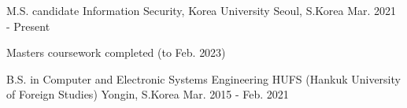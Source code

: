 

\begin{cventries}
  \cventry
    {M.S. candidate} %
    {Information Security, Korea University} %
    {Seoul, S.Korea} %
    {Mar. 2021 - Present} %
    {
      \begin{cvitems} %
        \item {Masters coursework completed (to Feb. 2023)}
      \end{cvitems}
    }

  \cventry
    {B.S. in Computer and Electronic Systems Engineering} %
    {HUFS (Hankuk University of Foreign Studies)} %
    {Yongin, S.Korea} %
    {Mar. 2015 - Feb. 2021} %
    {
    }

\end{cventries}
